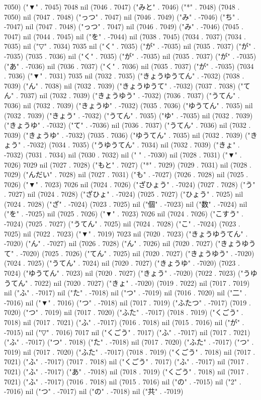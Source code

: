 7050) ("▼" . 7045) 7048 nil (7046 . 7047) ("みと" . 7046) ("*" . 7048) (7048 . 7050) nil (7047 . 7048) ("っつ" . 7047) nil (7046 . 7049) ("み" . -7046) ("ち" . -7047) nil (7047 . 7048) ("っつ" . 7047) nil (7046 . 7049) ("み" . -7046) (7045 . 7047) nil (7044 . 7045) nil ("を" . -7044) nil (7038 . 7045) (7034 . 7037) (7034 . 7035) nil ("▽" . 7034) 7035 nil ("く" . 7035) ("が" . -7035) nil (7035 . 7037) ("が" . -7035) (7035 . 7036) nil ("く" . 7035) ("が" . -7035) nil (7035 . 7037) ("が" . -7035) ("あ" . -7036) nil (7036 . 7037) ("く" . 7036) nil (7035 . 7037) ("が" . -7035) (7034 . 7036) ("▼" . 7031) 7035 nil (7032 . 7035) ("きょうゆうてん" . -7032) (7038 . 7039) ("ん" . 7038) nil (7032 . 7039) ("きょうゆうて" . -7032) (7037 . 7038) ("てん" . 7037) nil (7032 . 7039) ("きょうゆう" . -7032) (7036 . 7037) ("うてん" . 7036) nil (7032 . 7039) ("きょうゆ" . -7032) (7035 . 7036) ("ゆうてん" . 7035) nil (7032 . 7039) ("きょう" . -7032) ("うてん" . 7035) ("ゆ" . -7035) nil (7032 . 7039) ("きょうゆ" . -7032) ("て" . -7036) nil (7036 . 7037) ("うてん" . 7036) nil (7032 . 7039) ("きょうゆ" . -7032) (7035 . 7036) ("ゆうてん" . 7035) nil (7032 . 7039) ("きょう" . -7032) (7034 . 7035) ("うゆうてん" . 7034) nil (7032 . 7039) ("きょ" . -7032) (7031 . 7034) nil (7030 . 7032) nil (" " . -7030) nil (7028 . 7031) ("▼" . 7026) 7029 nil (7027 . 7028) ("もと" . 7027) ("*" . 7029) (7029 . 7031) nil (7028 . 7029) ("んだい" . 7028) nil (7027 . 7031) ("も" . -7027) (7026 . 7028) nil (7025 . 7026) ("▼" . 7023) 7026 nil (7024 . 7026) ("ざひょう" . -7024) (7027 . 7028) ("う" . 7027) nil (7024 . 7028) ("ざひょ" . -7024) (7025 . 7027) ("ひょう" . 7025) nil (7024 . 7028) ("ざ" . -7024) (7023 . 7025) nil ("個" . -7023) nil ("数" . -7024) nil ("を" . -7025) nil (7025 . 7026) ("▼" . 7023) 7026 nil (7024 . 7026) ("こすう" . -7024) (7025 . 7027) ("うてん" . 7025) nil (7024 . 7028) ("こ" . -7024) (7023 . 7025) nil (7022 . 7023) ("▼" . 7019) 7023 nil (7020 . 7023) ("きょうゆうてん" . -7020) ("ん" . -7027) nil (7026 . 7028) ("ん" . 7026) nil (7020 . 7027) ("きょうゆうて" . -7020) (7025 . 7026) ("てん" . 7025) nil (7020 . 7027) ("きょうゆう" . -7020) (7024 . 7025) ("うてん" . 7024) nil (7020 . 7027) ("きょうゆ" . -7020) (7023 . 7024) ("ゆうてん" . 7023) nil (7020 . 7027) ("きょう" . -7020) (7022 . 7023) ("うゆうてん" . 7022) nil (7020 . 7027) ("きょ" . -7020) (7019 . 7022) nil (7017 . 7019) nil ("ふ" . -7017) nil ("た" . -7018) nil ("つ" . -7019) nil (7016 . 7020) nil ("二" . -7016) nil ("▼" . 7016) ("つ" . -7018) nil (7017 . 7019) ("ふたつ" . -7017) (7019 . 7020) ("つ" . 7019) nil (7017 . 7020) ("ふた" . -7017) (7018 . 7019) ("くごう" . 7018) nil (7017 . 7021) ("ふ" . -7017) (7016 . 7018) nil (7015 . 7016) nil ("が" . -7015) nil ("▽" . 7016) 7017 nil ("くごう" . 7017) ("ふ" . -7017) nil (7017 . 7021) ("ふ" . -7017) ("つ" . 7018) ("た" . -7018) nil (7017 . 7020) ("ふた" . -7017) ("つ" . 7019) nil (7017 . 7020) ("ふた" . -7017) (7018 . 7019) ("くごう" . 7018) nil (7017 . 7021) ("ふ" . -7017) (7017 . 7018) nil ("くごう" . 7017) ("ふ" . -7017) nil (7017 . 7021) ("ふ" . -7017) ("あ" . -7018) nil (7018 . 7019) ("くごう" . 7018) nil (7017 . 7021) ("ふ" . -7017) (7016 . 7018) nil (7015 . 7016) nil ("の" . -7015) nil ("2" . -7016) nil ("つ" . -7017) nil ("の" . -7018) nil ("共" . -7019) 